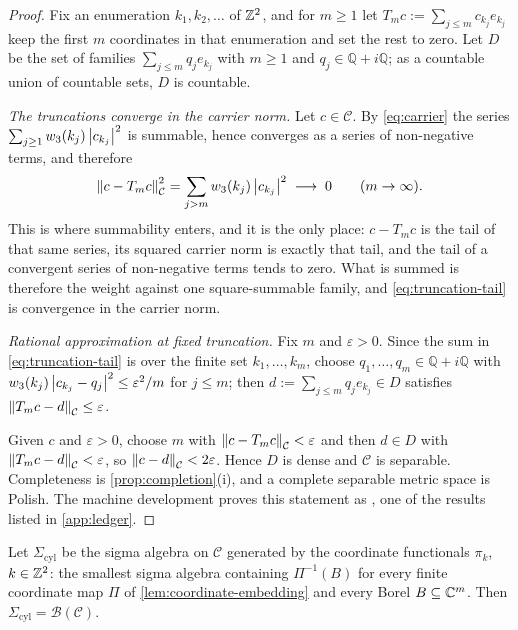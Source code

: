 \begin{proof}
Fix an enumeration $k_1,k_2,\dots$ of $\mathbb{Z}^2$, and for $m\ge1$ let
$T_mc:=\sum_{j\le m}c_{k_j}e_{k_j}$ keep the first $m$ coordinates in that
enumeration and set the rest to zero. Let $D$ be the set of families
$\sum_{j\le m}q_je_{k_j}$ with $m\ge1$ and $q_j\in\mathbb{Q}+i\mathbb{Q}$; as a
countable union of countable sets, $D$ is countable.

\emph{The truncations converge in the carrier norm.} Let $c\in\mathcal C$. By
\eqref{eq:carrier} the series $\sum_{j\ge1}w_3(k_j)\left| c_{k_j} \right|^2$ is
summable, hence converges as a series of non-negative terms, and therefore
\begin{equation}\label{eq:truncation-tail}
  \left\| c-T_mc \right\|_{\mathcal C}^2
  =\sum_{j>m}w_3(k_j)\left| c_{k_j} \right|^2\;\longrightarrow\;0
  \qquad(m\to\infty).
\end{equation}
This is where summability enters, and it is the only place: $c-T_mc$ is the tail
of that same series, its squared carrier norm is exactly that tail, and the tail
of a convergent series of non-negative terms tends to zero. What is summed is
therefore the weight against one square-summable family, and
\eqref{eq:truncation-tail} is convergence in the carrier norm.

\emph{Rational approximation at fixed truncation.} Fix $m$ and $\varepsilon>0$.
Since the sum in \eqref{eq:truncation-tail} is over the finite set
$k_1,\dots,k_m$, choose $q_1,\dots,q_m\in\mathbb{Q}+i\mathbb{Q}$ with
$w_3(k_j)\left| c_{k_j}-q_j \right|^2\le\varepsilon^2/m$ for $j\le m$; then
$d:=\sum_{j\le m}q_je_{k_j}\in D$ satisfies
$\left\| T_mc-d \right\|_{\mathcal C}\le\varepsilon$.

Given $c$ and $\varepsilon>0$, choose $m$ with
$\left\| c-T_mc \right\|_{\mathcal C}<\varepsilon$ and then $d\in D$ with
$\left\| T_mc-d \right\|_{\mathcal C}<\varepsilon$, so $\left\| c-d \right\|_{\mathcal C}<2\varepsilon$.
Hence $D$ is dense and $\mathcal C$ is separable. Completeness is
\cref{prop:completion}(i), and a complete separable metric space is Polish. The
machine development proves this statement as
, one of the results listed in
\cref{app:ledger}.
\end{proof}

\begin{theorem}\label{thm:cylinder-borel}
Let $\Sigma_{\mathrm{cyl}}$ be the sigma algebra on $\mathcal C$ generated by the
coordinate functionals $\pi_k$, $k\in\mathbb{Z}^2$: the smallest sigma algebra
containing $\Pi^{-1}(B)$ for every finite coordinate map $\Pi$ of
\cref{lem:coordinate-embedding} and every Borel $B\subseteq\mathbb{C}^m$. Then
$\Sigma_{\mathrm{cyl}}=\mathcal B(\mathcal C)$.
\end{theorem}

